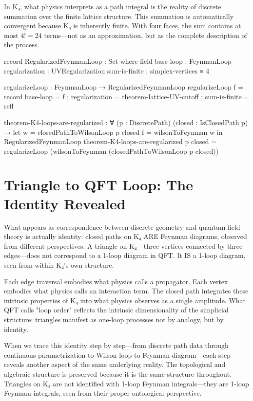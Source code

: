 \documentclass[11pt,a4paper]{book}
\begin{document}
In K₄, what physics interprets as a path integral is the reality of discrete summation over the finite 
lattice structure. This summation is automatically convergent because K₄ is inherently finite. 
With four faces, the sum contains at most $4! = 24$ terms—not as an approximation, but as the 
complete description of the process.

\begin{code}
record RegularizedFeynmanLoop : Set where
  field
    base-loop       : FeynmanLoop
    regularization  : UVRegularization
    sum-is-finite   : simplex-vertices ≡ 4

regularizeLoop : FeynmanLoop → RegularizedFeynmanLoop
regularizeLoop f = record
  { base-loop      = f
  ; regularization = theorem-lattice-UV-cutoff
  ; sum-is-finite  = refl
  }

theorem-K4-loops-are-regularized : ∀ (p : DiscretePath) (closed : IsClosedPath p) →
  let w = closedPathToWilsonLoop p closed
      f = wilsonToFeynman w
  in RegularizedFeynmanLoop
theorem-K4-loops-are-regularized p closed = 
  regularizeLoop (wilsonToFeynman (closedPathToWilsonLoop p closed))
\end{code}

\section{Triangle to QFT Loop: The Identity Revealed}

What appears as correspondence between discrete geometry and quantum field theory is actually 
identity: closed paths on K₄ ARE Feynman diagrams, observed from different perspectives.
A triangle on K₄—three vertices connected by three edges—does not correspond to a 1-loop diagram in QFT.
It IS a 1-loop diagram, seen from within K₄'s own structure.

Each edge traversal embodies what physics calls a propagator. Each vertex embodies what physics calls 
an interaction term. The closed path integrates these intrinsic properties of K₄ into what physics 
observes as a single amplitude. What QFT calls "loop order" reflects the intrinsic dimensionality 
of the simplicial structure: triangles manifest as one-loop processes not by analogy, but by identity.

When we trace this identity step by step—from discrete path data through continuous parametrization 
to Wilson loop to Feynman diagram—each step reveals another aspect of the same underlying reality. 
The topological and algebraic structure is preserved because it is the same structure throughout. 
Triangles on K₄ are not identified with 1-loop Feynman integrals—they are 1-loop Feynman integrals, 
seen from their proper ontological perspective.
\end{document}
